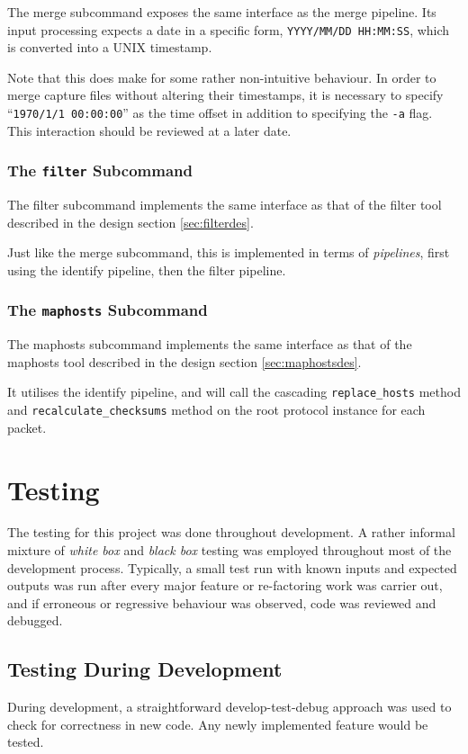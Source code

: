 \documentclass[10pt,a4paper,notitlepage]{report}
\begin{document}
The merge subcommand exposes the same interface as the merge pipeline. Its input processing expects a date in a specific form, \texttt{YYYY/MM/DD HH:MM:SS}, which is converted into a UNIX timestamp.

Note that this does make for some rather non-intuitive behaviour. In order to merge capture files without altering their timestamps, it is necessary to specify ``\texttt{1970/1/1 00:00:00}'' as the time offset in addition to specifying the \texttt{-a} flag. This interaction should be reviewed at a later date.

\subsection{The \texttt{filter} Subcommand}
The filter subcommand implements the same interface as that of the filter tool described in the design section \ref{sec:filterdes}.

Just like the merge subcommand, this is implemented in terms of \emph{pipelines}, first using the identify pipeline, then the filter pipeline.

\subsection{The \texttt{maphosts} Subcommand}
The maphosts subcommand implements the same interface as that of the maphosts tool described in the design section \ref{sec:maphostsdes}.

It utilises the identify pipeline, and will call the cascading \texttt{replace_hosts} method and \texttt{recalculate_checksums} method on the root protocol instance for each packet.

\chapter{Testing}
The testing for this project was done throughout development. 
A rather informal mixture of \emph{white box} and \emph{black box} testing was employed throughout most of the development process. Typically, a small test run with known inputs and expected outputs was run after every major feature or re-factoring work was carrier out, and if erroneous or regressive behaviour was observed, code was reviewed and debugged.

\section{Testing During Development}
During development, a straightforward develop-test-debug approach was used to check for correctness in new code. Any newly implemented feature would be tested.
\end{document}
